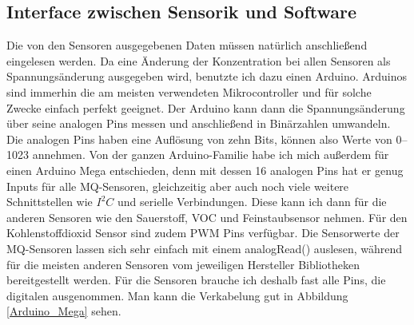 \documentclass[10pt]{article}
\begin{document}
\subsection{Interface zwischen Sensorik und Software}
Die von den Sensoren ausgegebenen Daten müssen natürlich anschließend eingelesen werden. Da eine Änderung der Konzentration bei allen Sensoren als
Spannungsänderung ausgegeben wird, benutzte ich dazu einen Arduino. Arduinos sind immerhin die am meisten verwendeten 
Mikrocontroller und für solche Zwecke einfach perfekt geeignet. Der Arduino kann dann die Spannungsänderung über seine analogen Pins
messen und anschließend in Binärzahlen umwandeln. Die analogen Pins haben eine Auflösung von zehn Bits, können also Werte von 0–1023 annehmen. Von der ganzen Arduino-Familie
habe ich mich außerdem für einen Arduino Mega entschieden, denn mit dessen 16 analogen Pins hat er genug Inputs für alle MQ-Sensoren, gleichzeitig aber auch noch viele weitere Schnittstellen 
wie $I^2C$ und serielle Verbindungen. Diese kann ich dann für die anderen Sensoren wie den Sauerstoff, VOC und Feinstaubsensor nehmen.
Für den Kohlenstoffdioxid Sensor sind zudem PWM Pins verfügbar. Die Sensorwerte der MQ-Sensoren lassen sich sehr einfach mit einem analogRead() auslesen, während für die meisten
anderen Sensoren vom jeweiligen Hersteller Bibliotheken bereitgestellt werden. Für die Sensoren brauche ich deshalb fast alle Pins, die digitalen ausgenommen. Man kann die Verkabelung
gut in Abbildung \ref{Arduino_Mega} sehen.
\end{document}
